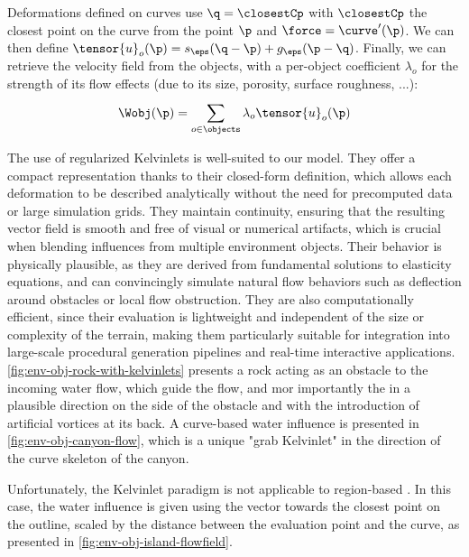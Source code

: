 Deformations defined on curves use $\q = \closestCp$ with $\closestCp$ the closest point on the curve from the point $\p$ and $\force = \curve'(\p)$. We can then define $\tensor{u}_o(\p) = s_\eps(\q - \p) + g_\eps(\p - \q)$.
Finally, we can retrieve the velocity field from the objects, with a per-object coefficient $\lambda_o$ for the strength of its flow effects (due to its size, porosity, surface roughness, ...):
\begin{align}
    \Wobj(\p) = \sum_{o \in \objects}^{}{\lambda_o \tensor{u}_o(\p)}
\end{align}

The use of regularized Kelvinlets is well-suited to our model. They offer a compact representation thanks to their closed-form definition, which allows each deformation to be described analytically without the need for precomputed data or large simulation grids. They maintain continuity, ensuring that the resulting vector field is smooth and free of visual or numerical artifacts, which is crucial when blending influences from multiple environment objects. Their behavior is physically plausible, as they are derived from fundamental solutions to elasticity equations, and can convincingly simulate natural flow behaviors such as deflection around obstacles or local flow obstruction. They are also computationally efficient, since their evaluation is lightweight and independent of the size or complexity of the terrain, making them particularly suitable for integration into large-scale procedural generation pipelines and real-time interactive applications. \cref{fig:env-obj-rock-with-kelvinlets} presents a rock acting as an obstacle to the incoming water flow, which guide the flow, and mor importantly the  in a plausible direction on the side of the obstacle and with the introduction of artificial vortices at its back. A curve-based water influence is presented in \cref{fig:env-obj-canyon-flow}, which is a unique "grab Kelvinlet" in the direction of the curve skeleton of the canyon. 

Unfortunately, the Kelvinlet paradigm is not applicable to region-based . In this case, the water influence is given using the vector towards the closest point on the outline, scaled by the distance between the evaluation point and the curve, as presented in \cref{fig:env-obj-island-flowfield}. 


